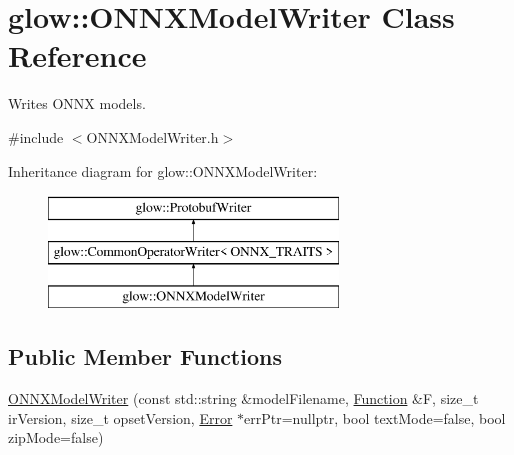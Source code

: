 \hypertarget{classglow_1_1_o_n_n_x_model_writer}{}\section{glow\+:\+:O\+N\+N\+X\+Model\+Writer Class Reference}
\label{classglow_1_1_o_n_n_x_model_writer}


Writes O\+N\+NX models.  




{\ttfamily \#include $<$O\+N\+N\+X\+Model\+Writer.\+h$>$}

Inheritance diagram for glow\+:\+:O\+N\+N\+X\+Model\+Writer\+:\begin{figure}[H]
\begin{center}
\leavevmode
\includegraphics[height=3.000000cm]{classglow_1_1_o_n_n_x_model_writer}
\end{center}
\end{figure}
\subsection*{Public Member Functions}
\begin{DoxyCompactItemize}
\item 
\hyperlink{classglow_1_1_o_n_n_x_model_writer_a206d9db5afaa32748fc0d7dab0dedc7f}{O\+N\+N\+X\+Model\+Writer} (const std\+::string \&model\+Filename, \hyperlink{classglow_1_1_function}{Function} \&F, size\+\_\+t ir\+Version, size\+\_\+t opset\+Version, \hyperlink{namespaceglow_afdb176c3a672ef66db0ecfc19a8d39bf}{Error} $\ast$err\+Ptr=nullptr, bool text\+Mode=false, bool zip\+Mode=false)
\end{DoxyCompactItemize}
